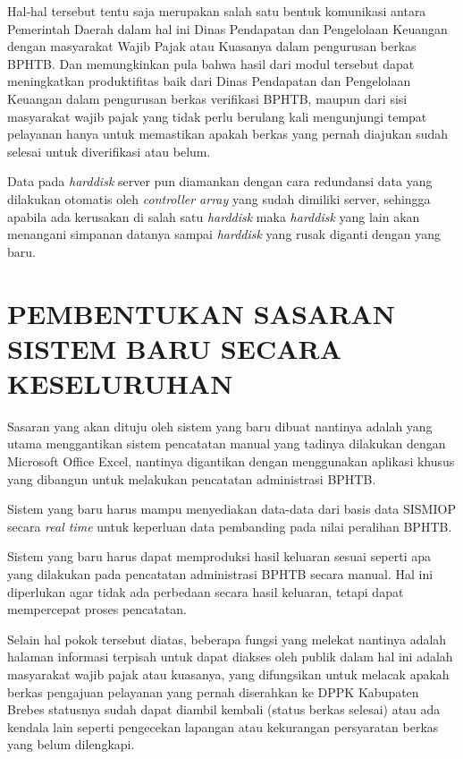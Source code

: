 \documentclass[pdftex,12pt, oneside]{article}
\begin{document}
Hal-hal tersebut tentu saja merupakan salah satu bentuk komunikasi antara Pemerintah Daerah dalam hal ini Dinas Pendapatan dan Pengelolaan Keuangan dengan masyarakat Wajib Pajak atau Kuasanya dalam pengurusan berkas BPHTB. Dan memungkinkan pula bahwa hasil dari modul tersebut dapat meningkatkan produktifitas baik dari Dinas Pendapatan dan Pengelolaan Keuangan dalam pengurusan berkas verifikasi BPHTB, maupun dari sisi masyarakat wajib pajak yang tidak perlu berulang kali mengunjungi tempat pelayanan hanya untuk memastikan apakah berkas yang pernah diajukan sudah selesai untuk diverifikasi atau belum.

Data pada \textit{harddisk} server pun diamankan dengan cara redundansi data yang dilakukan otomatis oleh \textit{controller array} yang sudah dimiliki server, sehingga apabila ada kerusakan di salah satu \textit{harddisk} maka \textit{harddisk} yang lain akan menangani simpanan datanya sampai \textit{harddisk} yang rusak diganti dengan yang baru.

\section{PEMBENTUKAN SASARAN SISTEM BARU SECARA KESELURUHAN}

Sasaran yang akan dituju oleh sistem yang baru dibuat nantinya adalah yang utama menggantikan sistem pencatatan manual yang tadinya dilakukan dengan Microsoft Office Excel, nantinya digantikan dengan menggunakan aplikasi khusus yang dibangun untuk melakukan pencatatan administrasi BPHTB.

Sistem yang baru harus mampu menyediakan data-data dari basis data SISMIOP secara \textit{real time} untuk keperluan data pembanding pada nilai peralihan BPHTB. 

Sistem yang baru harus dapat memproduksi hasil keluaran sesuai seperti apa yang dilakukan pada pencatatan administrasi BPHTB secara manual. Hal ini diperlukan agar tidak ada perbedaan secara hasil keluaran, tetapi dapat mempercepat proses pencatatan.

Selain hal pokok tersebut diatas, beberapa fungsi yang melekat nantinya adalah halaman informasi terpisah untuk dapat diakses oleh publik dalam hal ini adalah masyarakat wajib pajak atau kuasanya, yang difungsikan untuk melacak apakah berkas pengajuan pelayanan yang pernah diserahkan ke DPPK Kabupaten Brebes statusnya sudah dapat diambil kembali (status berkas selesai) atau ada kendala lain seperti pengecekan lapangan atau kekurangan persyaratan berkas yang belum dilengkapi.
\end{document}
